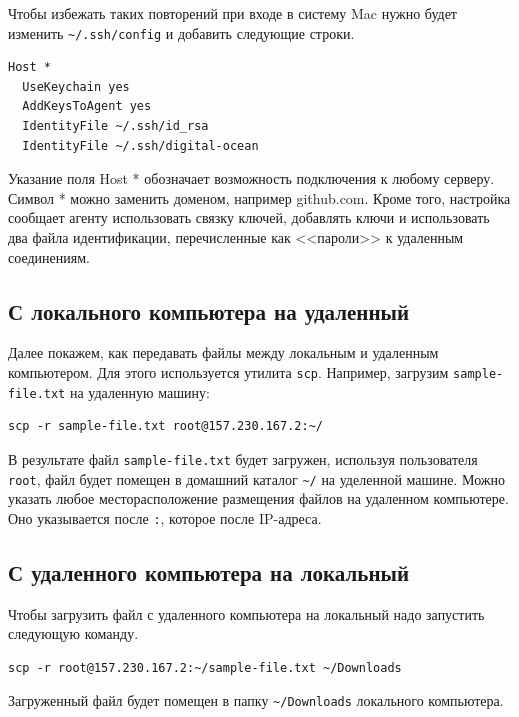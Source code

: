 \documentclass[a4paper,12pt,final,openany]{extbook}
\begin{document}
Чтобы избежать таких повторений при входе в систему Mac нужно будет
изменить \texttt{\textasciitilde{}/.ssh/config} и добавить следующие
строки.
\begin{verbatim}
Host *
  UseKeychain yes
  AddKeysToAgent yes
  IdentityFile ~/.ssh/id_rsa
  IdentityFile ~/.ssh/digital-ocean
\end{verbatim}
Указание поля Host * обозначает возможность подключения к любому
серверу. Символ * можно заменить доменом, например github.com. Кроме
того, настройка сообщает агенту использовать связку ключей, добавлять
ключи и использовать два файла идентификации, перечисленные как <<пароли>>
к удаленным соединениям.

\hypertarget{From-local-computer-to-remote-machine}{%
\subsection{\texorpdfstring{\protect\hyperlink{From-local-computer-to-remote-machine}{}С
локального компьютера на
удаленный}{С локального компьютера на удаленный}}\label{From-local-computer-to-remote-machine}}

Далее покажем, как передавать файлы между локальным и удаленным
компьютером. Для этого используется утилита \texttt{scp}.
Например, загрузим \texttt{sample-file.txt} на удаленную машину:
\begin{verbatim}
scp -r sample-file.txt root@157.230.167.2:~/
\end{verbatim}
В результате файл \texttt{sample-file.txt} будет загружен, используя
пользователя \texttt{root}, файл будет помещен в домашний каталог
\texttt{\textasciitilde{}/} на уделенной машине. Можно указать любое
месторасположение размещения файлов на удаленном компьютере. Оно
указывается после \texttt{:}, которое после IP-адреса.

\hypertarget{From-remote-machine-to-local-computer}{%
\subsection{\texorpdfstring{\protect\hyperlink{From-remote-machine-to-local-computer}{}С
удаленного компьютера на
локальный}{С удаленного компьютера на локальный}}\label{From-remote-machine-to-local-computer}}

Чтобы загрузить файл с удаленного компьютера на локальный надо запустить
следующую команду.
\begin{verbatim}
scp -r root@157.230.167.2:~/sample-file.txt ~/Downloads
\end{verbatim}
Загруженный файл будет помещен в папку
\texttt{\textasciitilde{}/Downloads} локального компьютера.
\end{document}

